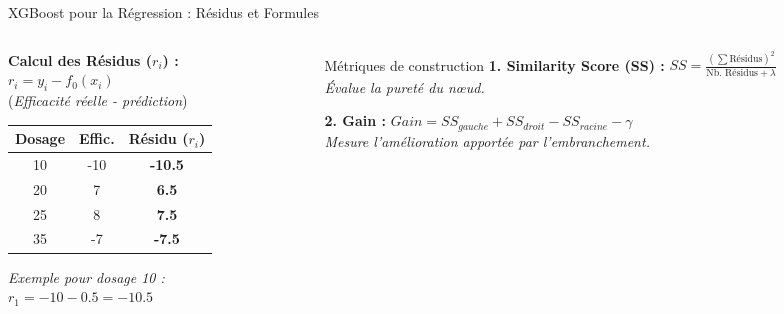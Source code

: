 \begin{frame}{XGBoost pour la Régression : Résidus et Formules}
    \begin{columns}[T]
        \begin{column}{0.4\textwidth}
            \textbf{Calcul des Résidus ($r_i$) :} \\
            $r_i = y_i - f_0(x_i)$ \\
            \scriptsize (\textit{Efficacité réelle - prédiction})
            \vspace{0.1cm}
            
            \begin{table}
                \centering
                \scriptsize
                \begin{tabular}{|c|c|c|}
                    \hline
                    \textbf{Dosage} & \textbf{Effic.} & \textbf{Résidu ($r_i$)} \\
                    \hline
                    10 & -10 & \textbf{-10.5} \\
                    20 & 7 & \textbf{6.5} \\
                    25 & 8 & \textbf{7.5} \\
                    35 & -7 & \textbf{-7.5} \\
                    \hline
                \end{tabular}
            \end{table}
            
            \vspace{0.2cm}
            \scriptsize
            \textit{Exemple pour dosage 10 :} \\
            $r_1 = -10 - 0.5 = -10.5$
        \end{column}
        
        \begin{column}{0.6\textwidth}
            \begin{block}{Métriques de construction}
                \scriptsize
                \textbf{1. Similarity Score (SS) :}
                $ SS = \frac{(\sum \text{Résidus})^2}{\text{Nb. Résidus} + \lambda} $ \\
                \textit{Évalue la pureté du nœud.}
                
                \textbf{2. Gain :} 
                $ Gain = SS_{gauche} + SS_{droit} - SS_{racine} - \gamma $ \\
                \textit{Mesure l'amélioration apportée par l'embranchement.}
                

\end{block}
\end{column}
\end{columns}
\end{frame}
